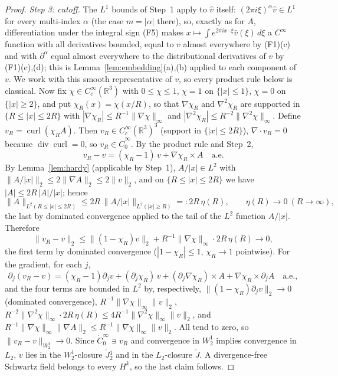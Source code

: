 \documentclass[11pt]{article}
\theoremstyle{definition}
\theoremstyle{plain}
\newcommand{\R}{\mathbb R}
\newcommand{\norm}[1]{\lVert #1\rVert}
\begin{document}
\begin{proof}
\emph{Step 3: cutoff.}  The $L^1$ bounds of Step~1 apply to $\hat v$ itself:
$(2\pi i\xi)^\alpha\hat v\in L^1$ for every multi-index $\alpha$ (the case
$m=|\alpha|$ there), so, exactly as for $A$, differentiation under the
integral sign (F5) makes
$x\mapsto\int e^{2\pi ix\cdot\xi}\hat v(\xi)\,d\xi$ a $C^\infty$ function with
all derivatives bounded, equal to $v$ almost everywhere by (F1)(c) and with
$\partial^\alpha$ equal almost everywhere to the distributional derivatives
of $v$ by (F1)(c),(d); this is Lemma~\ref{lem:embedding}(a),(b)
applied to each component of $v$.  We work with
this smooth representative of $v$, so every product rule below is classical.
Now fix $\chi\in C_c^\infty(\R^3)$ with $0\leq\chi\leq1$,
$\chi=1$ on $\{|x|\leq1\}$, $\chi=0$ on $\{|x|\geq2\}$, and put
$\chi_R(x)=\chi(x/R)$, so that $\nabla\chi_R$ and $\nabla^2\chi_R$ are
supported in $\{R\leq|x|\leq2R\}$ with $|\nabla\chi_R|\leq R^{-1}\norm{\nabla\chi}_\infty$
and $|\nabla^2\chi_R|\leq R^{-2}\norm{\nabla^2\chi}_\infty$.  Define
$v_R=\operatorname{curl}(\chi_RA)$.  Then $v_R\in C_c^\infty(\R^3)^3$
(support in $\{|x|\leq2R\}$), $\nabla\cdot v_R=0$ because
$\operatorname{div}\operatorname{curl}=0$, so $v_R\in\dot C_0^\infty$.  By the
product rule and Step~2,
\[
 v_R-v=(\chi_R-1)\,v+\nabla\chi_R\times A\quad\text{a.e.}
\]
By Lemma~\ref{lem:hardy} (applicable by Step~1),
$A/|x|\in L^2$ with $\norm{A/|x|}_2\leq2\norm{\nabla A}_2\leq2\norm v_2$, and on
$\{R\leq|x|\leq2R\}$ we have $|A|\leq2R\,|A|/|x|$; hence
\[
 \norm{A}_{L^2(R\leq|x|\leq2R)}\leq2R\,\norm{A/|x|}_{L^2(|x|\geq R)}
 =:2R\,\eta(R),\qquad \eta(R)\to0\ (R\to\infty),
\]
the last by dominated convergence applied to the tail of the $L^2$ function
$A/|x|$.  Therefore
\[
 \norm{v_R-v}_2\leq\norm{(1-\chi_R)v}_2+R^{-1}\norm{\nabla\chi}_\infty\cdot2R\,\eta(R)
 \longrightarrow0,
\]
the first term by dominated convergence ($|1-\chi_R|\leq1$, $\chi_R\to1$
pointwise).  For the gradient, for each $j$,
\[
 \partial_j(v_R-v)=(\chi_R-1)\partial_jv+(\partial_j\chi_R)\,v
 +(\partial_j\nabla\chi_R)\times A+\nabla\chi_R\times\partial_jA\quad\text{a.e.},
\]
and the four terms are bounded in $L^2$ by, respectively,
$\norm{(1-\chi_R)\partial_jv}_2\to0$ (dominated convergence),
$R^{-1}\norm{\nabla\chi}_\infty\norm v_2$,
$R^{-2}\norm{\nabla^2\chi}_\infty\cdot2R\,\eta(R)\leq4R^{-1}\norm{\nabla^2\chi}_\infty\norm v_2$,
and $R^{-1}\norm{\nabla\chi}_\infty\norm{\nabla A}_2\leq R^{-1}\norm{\nabla\chi}_\infty\norm v_2$.
All tend to zero, so $\norm{v_R-v}_{W^1_2}\to0$.  Since $\dot C_0^\infty\ni v_R$
and convergence in $W^1_2$ implies convergence in $L_2$, $v$ lies in the
$W^1_2$-closure $\mathring J{}^1_2$ and in the $L_2$-closure $\mathring J$.
A divergence-free Schwartz field belongs to every $H^k$, so the last claim
follows.
\end{proof}
\end{document}

